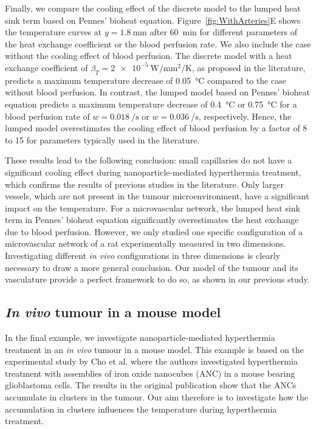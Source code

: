\documentclass[Times1COL,AMA]{WileyNJDv5} %
\begin{document}
Finally, we compare the cooling effect of the discrete model to the lumped heat sink term based on Pennes' bioheat equation.
Figure~\ref{fig:WithArteries}E shows the temperature curves at $y = \SI{1.8}{\milli\meter}$ after \SI{60}{\minute} for different parameters of the heat exchange coefficient or the blood perfusion rate.
We also include the case without the cooling effect of blood perfusion.
The discrete model with a heat exchange coefficient of $\beta_T = \SI{2e-5}{\watt\per\milli\meter\squared\per\kelvin}$, as proposed in the literature, \cite{Nabil2015,Nabil2016} predicts a maximum temperature decrease of \SI{0.05}{\celsius} compared to the case without blood perfusion.
In contrast, the lumped model based on Pennes' bioheat equation predicts a maximum temperature decrease of \SI{0.4}{\celsius} or \SI{0.75}{\celsius} for a blood perfusion rate of $w = \SI[per-mode=reciprocal]{0.018}{\per\second}$ or $w = \SI[per-mode=reciprocal]{0.036}{\per\second}$, respectively.
Hence, the lumped model overestimates the cooling effect of blood perfusion by a factor of 8 to 15 for parameters typically used in the literature.

These results lead to the following conclusion:
small capillaries do not have a significant cooling effect during nanoparticle-mediated hyperthermia treatment, which confirms the results of previous studies in the literature. \cite{Weinbaum1985,Yuan2008}
Only larger vessels, which are not present in the tumour microenvironment, have a significant impact on the temperature.
For a microvascular network, the lumped heat sink term in Pennes' bioheat equation significantly overestimates the heat exchange due to blood perfusion.
However, we only studied one specific configuration of a microvascular network of a rat experimentally measured in two dimensions.
Investigating different \textit{in vivo} configurations in three dimensions is clearly necessary to draw a more general conclusion.
Our model of the tumour and its vasculature provide a perfect framework to do so, as shown in our previous study. \cite{Kremheller2021}

\subsection{\textit{In vivo} tumour in a mouse model}
\label{sec:MouseModel}

In the final example, we investigate nanoparticle-mediated hyperthermia treatment in an \textit{in vivo} tumour in a mouse model.
This example is based on the experimental study by Cho et al. \cite{Cho2017} where the authors investigated hyperthermia treatment with assemblies of iron oxide nanocubes (ANC) in a mouse bearing glioblastoma cells.
The results in the original publication \cite{Cho2017} show that the ANCs accumulate in clusters in the tumour.
Our aim therefore is to investigate how the accumulation in clusters influences the temperature during hyperthermia treatment.
\end{document}
